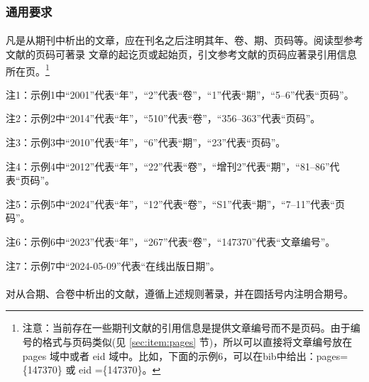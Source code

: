 \documentclass[twoside]{article}%
\begin{document}
\subsubsection{通用要求}\label{sec:article:request}

\paragraph{}\label{sec:inbook:f} 凡是从期刊中析出的文章，应在刊名之后注明其年、卷、期、页码等。阅读型参考文献的页码可著录
文章的起讫页或起始页，引文参考文献的页码应著录引用信息所在页。\footnote{注意：当前存在一些期刊文献的引用信息是提供文章编号而不是页码。由于编号的格式与页码类似(见 \ref{sec:item:pages} 节)，所以可以直接将文章编号放在 pages 域中或者 eid 域中。比如，下面的示例6，可以在bib中给出：pages=\{147370\} 或  eid =\{147370\}。}

\begin{refsection}

\nocite{egdatevolnumpagea--,egdatevolnumpageb--,%
egdatevolnumpagec--,egdatevolnumpaged--,egdatevolnumpageda--,egdatevolnumpageg--,egdatevolnumpageh--}

{}
\end{refsection}

\mbox{}{\small 注1：示例1中“2001”代表“年”，“2”代表“卷”，“1”代表“期”，“5–6”代表“页码”。\par}
\mbox{}{\small 注2：示例2中“2014”代表“年”，“510”代表“卷”，“356–363”代表“页码”。\par}
\mbox{}{\small 注3：示例3中“2010”代表“年”，“6”代表“期”，“23”代表“页码”。\par}
\mbox{}{\small 注4：示例4中“2012”代表“年”，“22”代表“卷”，“增刊2”代表“期”，“81–86”代表“页码”。\par}
\mbox{}{\small 注5：示例5中“2024”代表“年”，“12”代表“卷”，“S1”代表“期”，“7–11”代表“页码”。\par}
\mbox{}{\small 注6：示例6中“2023”代表“年”，“267”代表“卷”，“147370”代表“文章编号”。\par}
\mbox{}{\small 注7：示例7中“2024-05-09”代表“在线出版日期”。\par}


\paragraph{}\label{sec:inbook:c} 对从合期、合卷中析出的文献，遵循上述规则著录，并在圆括号内注明合期号。

\begin{refsection}
\nocite{egdatevolnumpagee--}

{}
\end{refsection}
\end{document}
